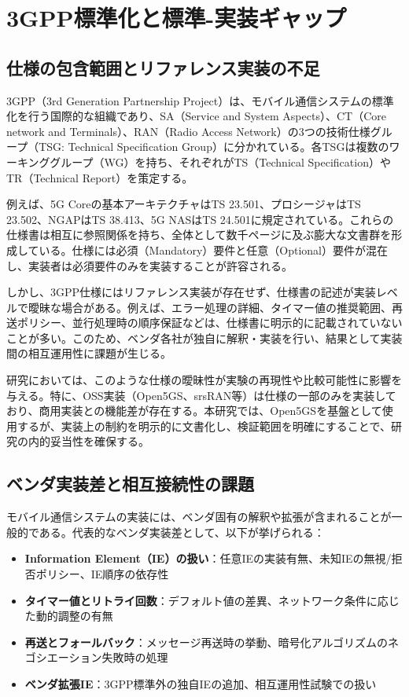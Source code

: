 \section{3GPP標準化と標準-実装ギャップ}

\subsection{仕様の包含範囲とリファレンス実装の不足}

3GPP（3rd Generation Partnership Project）は、モバイル通信システムの標準化を行う国際的な組織であり、SA（Service and System Aspects）、CT（Core network and Terminals）、RAN（Radio Access Network）の3つの技術仕様グループ（TSG: Technical Specification Group）に分かれている。各TSGは複数のワーキンググループ（WG）を持ち、それぞれがTS（Technical Specification）やTR（Technical Report）を策定する。

例えば、5G Coreの基本アーキテクチャはTS 23.501、プロシージャはTS 23.502、NGAPはTS 38.413、5G NASはTS 24.501に規定されている。これらの仕様書は相互に参照関係を持ち、全体として数千ページに及ぶ膨大な文書群を形成している。仕様には必須（Mandatory）要件と任意（Optional）要件が混在し、実装者は必須要件のみを実装することが許容される。

しかし、3GPP仕様にはリファレンス実装が存在せず、仕様書の記述が実装レベルで曖昧な場合がある。例えば、エラー処理の詳細、タイマー値の推奨範囲、再送ポリシー、並行処理時の順序保証などは、仕様書に明示的に記載されていないことが多い。このため、ベンダ各社が独自に解釈・実装を行い、結果として実装間の相互運用性に課題が生じる。

研究においては、このような仕様の曖昧性が実験の再現性や比較可能性に影響を与える。特に、OSS実装（Open5GS、srsRAN等）は仕様の一部のみを実装しており、商用実装との機能差が存在する。本研究では、Open5GSを基盤として使用するが、実装上の制約を明示的に文書化し、検証範囲を明確にすることで、研究の内的妥当性を確保する。

\subsection{ベンダ実装差と相互接続性の課題}

モバイル通信システムの実装には、ベンダ固有の解釈や拡張が含まれることが一般的である。代表的なベンダ実装差として、以下が挙げられる：

\begin{itemize}
\item \textbf{Information Element（IE）の扱い}：任意IEの実装有無、未知IEの無視/拒否ポリシー、IE順序の依存性
\item \textbf{タイマー値とリトライ回数}：デフォルト値の差異、ネットワーク条件に応じた動的調整の有無
\item \textbf{再送とフォールバック}：メッセージ再送時の挙動、暗号化アルゴリズムのネゴシエーション失敗時の処理
\item \textbf{ベンダ拡張IE}：3GPP標準外の独自IEの追加、相互運用性試験での扱い
\end{itemize}

